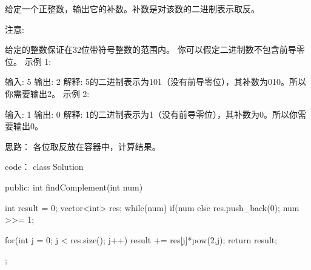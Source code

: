 给定一个正整数，输出它的补数。补数是对该数的二进制表示取反。

注意:

给定的整数保证在32位带符号整数的范围内。
你可以假定二进制数不包含前导零位。
示例 1:

输入: 5
输出: 2
解释: 5的二进制表示为101（没有前导零位），其补数为010。所以你需要输出2。
示例 2:

输入: 1
输出: 0
解释: 1的二进制表示为1（没有前导零位），其补数为0。所以你需要输出0。



























思路：
各位取反放在容器中，计算结果。



























code：
class Solution {
public:
    int findComplement(int num) {
        int result = 0;
        vector<int> res;
        while(num)
        {
            if(num %
            else res.push_back(0);
            num >>= 1;
        }
        
        for(int j = 0; j < res.size(); j++)
        {
            result += res[j]*pow(2,j);
        }
        return result;
    }
};